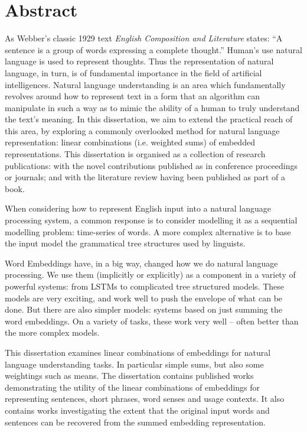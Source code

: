 \documentclass{book}
\begin{document}
		
\chapter*{Abstract}
As Webber's classic 1929 text \textit{English Composition and Literature} states:
``A sentence is a group of words expressing a complete thought.''
Human's use natural language is used to represent thoughts.
Thus the representation of natural language, in turn, is of fundamental importance in the field of artificial intelligences.
Natural language understanding is an area which fundamentally revolves around how to represent text in a form that an algorithm can manipulate in such a way as to mimic the ability of a human to truly understand the text's meaning.
In this dissertation, we aim to extend the practical reach of this area,
by exploring a commonly overlooked method for natural language representation: linear combinations (i.e. weighted sums) of embedded representations.
This dissertation is organised as a collection of research publications: with the novel contributions published as in conference proceedings or journals; and with the literature review having been published as part of a book.

When considering how to represent English input into a natural language processing system,
a common response is to consider modelling it as a sequential modelling problem: time-series of words.
A more complex alternative is to base the input model the grammatical tree structures used by linguists.




Word Embeddings have, in a big way, changed how we do natural language processing.
We use them (implicitly or explicitly) as a component in a variety of powerful systems:
from LSTMs to complicated tree structured models.
These models are very exciting, and work well to push the envelope of what can be done.
But there are also simpler models: systems based on just summing the word embeddings.
On a variety of tasks, these work very well -- often better than the more complex models.

This dissertation examines linear combinations of embeddings for natural language understanding tasks.
In particular simple sums, but also some weightings such as means.
The dissertation contains published works demonstrating the utility of the linear combinations of embeddings
for representing sentences, short phrases, word senses and usage contexts.
It also contains works investigating the extent that the original input words and sentences can be recovered from the summed embedding representation.
\end{document}
